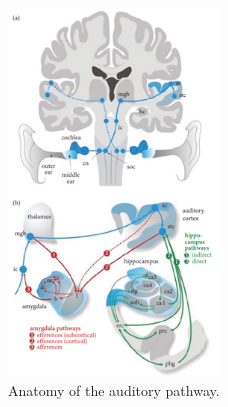 \documentclass{article}
\begin{document}
\begin{figure}  %
\centering
\includegraphics[width=0.5\textwidth]{pathways.png}  %
\caption{Anatomy of the auditory pathway.}
\label{fig:auditory-pathway}
\end{figure}
\end{document}
